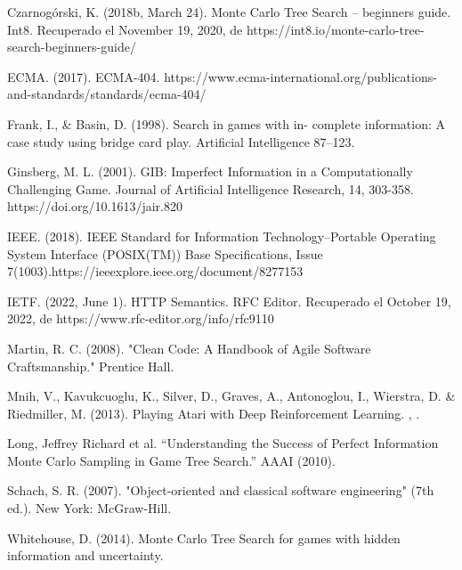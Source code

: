 \documentclass[11pt, oneside]{book}
\begin{document}
\begin{thebibliography}{111}
      Czarnogórski, K. (2018b, March 24). Monte Carlo Tree
      Search – beginners guide. Int8. Recuperado el November 19, 2020, de
      https://int8.io/monte-carlo-tree-search-beginners-guide/

      ECMA. (2017). ECMA-404.
      https://www.ecma-international.org/publications-and-standards/standards/ecma-404/

      Frank, I., \& Basin, D. (1998). Search in games with in-
      complete information: A case study using bridge card play. Artificial
      Intelligence 87–123.

      Ginsberg, M. L. (2001). GIB: Imperfect Information in
      a Computationally Challenging Game. Journal of Artificial Intelligence
      Research, 14, 303-358. https://doi.org/10.1613/jair.820

      IEEE. (2018). IEEE Standard for Information
      Technology--Portable Operating System Interface (POSIX(TM)) Base
      Specifications, Issue 7(1003).https://ieeexplore.ieee.org/document/8277153

      IETF. (2022, June 1). HTTP Semantics. RFC Editor.
      Recuperado el October 19, 2022, de https://www.rfc-editor.org/info/rfc9110

      Martin, R. C. (2008). "Clean Code: A Handbook of Agile
      Software Craftsmanship." Prentice Hall.

      Mnih, V., Kavukcuoglu, K., Silver, D., Graves, A.,
      Antonoglou, I., Wierstra, D. \& Riedmiller, M. (2013). Playing Atari with
      Deep Reinforcement Learning. , .

      Long, Jeffrey Richard et al. “Understanding the Success
      of Perfect Information Monte Carlo Sampling in Game Tree Search.” AAAI
      (2010).

      Schach, S. R. (2007). "Object-oriented and classical
      software engineering" (7th ed.). New York: McGraw-Hill.


      Whitehouse, D. (2014). Monte Carlo Tree Search for games with
      hidden information and uncertainty.





\end{thebibliography}
\end{document}
